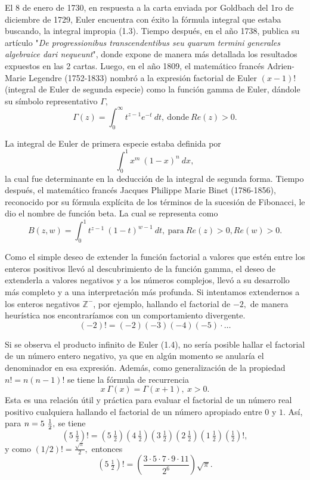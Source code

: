 El 8 de enero de 1730, en respuesta a la carta enviada por Goldbach del 1ro de diciembre de 1729, Euler encuentra con éxito la fórmula integral que estaba buscando, la integral impropia (1.3). Tiempo después, en el año 1738, publica su artículo "\textit{De progressionibus transcendentibus seu quarum termini generales algebraice dari nequeunt}", donde expone de manera más detallada los resultados expuestos en las 2 cartas. Luego, en el año 1809, el matemático francés Adrien-Marie Legendre (1752-1833) nombró a la expresión factorial de Euler $(x-1)!$ (integral de Euler de segunda especie) como la función gamma de Euler, dándole su símbolo representativo $\Gamma,$ $$\Gamma(z) = \int_{0}^{\infty}t^{z-1}e^{-t}\ dt,\ \textrm{donde}\ Re(z)>0.$$

La integral de Euler de primera especie estaba definida por $$\int_{0}^{1} x^m\ (1-x)^n\ dx,$$ la cual fue determinante en la deducción de la integral de segunda forma. Tiempo después, el matemático francés Jacques Philippe Marie Binet (1786-1856), reconocido por su fórmula explícita de los términos de la sucesión de Fibonacci, le dio el nombre de función beta. La cual se representa como $$B(z,w) = \int_{0}^{1} t^{z-1}\ (1-t)^{w-1}\ dt,\ \textrm{para}\ Re(z)>0, Re(w)>0.$$

Como el simple deseo de extender la función factorial a valores que estén entre los enteros positivos llevó al descubrimiento de la función gamma, el deseo de extenderla a valores negativos y a los números complejos, llevó a su desarrollo más completo y a una interpretación más profunda. Si intentamos extendernos a los enteros negativos $\mathbb{Z}^-$, por ejemplo, hallando el factorial de $-2,$ de manera heurística nos encontraríamos con un comportamiento divergente. $$(-2)! = (-2)(-3)(-4)(-5)\cdot\dots$$ 

Si se observa el producto infinito de Euler (1.4), no sería posible hallar el factorial de un número entero negativo, ya que en algún momento se anularía el denominador en esa expresión. Además, como generalización de la propiedad $n! = n(n-1)!$ se tiene la fórmula de recurrencia 
\begin{equation}
	x\ \Gamma(x) = \Gamma(x+1),\ x>0.
\end{equation} 
Esta es una relación útil y práctica para evaluar el factorial de un número real positivo cualquiera hallando el factorial de un número apropiado entre $0$ y $1.$ Así, para $n = 5\ {1 \over 2},$ se tiene $$\left(5\ \tfrac{1}{2}\right)! = \left(5\ \tfrac{1}{2}\right)\left(4\ \tfrac{1}{2}\right)\left(3\ \tfrac{1}{2}\right)\left(2\ \tfrac{1}{2}\right)\left(1\ \tfrac{1}{2}\right)\left(\tfrac{1}{2}\right)!,$$ y como $(1/2)! = \frac{\sqrt{\pi}}{2},$ entonces $$\left(5\ \tfrac{1}{2}\right)! = \left(\frac{3\cdot5\cdot7\cdot9\cdot11}{2^6}\right)\sqrt{\pi}.$$
 
